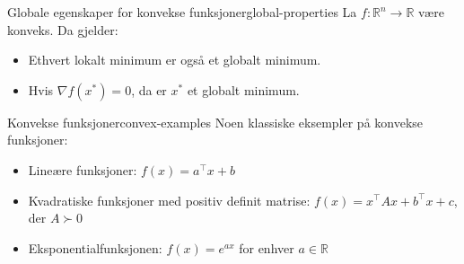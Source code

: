 \begin{theorem}{Globale egenskaper for konvekse funksjoner}{global-properties}
    La $f: \mathbb{R}^n \to \mathbb{R}$ være konveks. Da gjelder:
    \begin{itemize}
        \item Ethvert lokalt minimum er også et globalt minimum.
        \item Hvis $\nabla f(x^*) = 0$, da er $x^*$ et globalt minimum.
    \end{itemize}
\end{theorem}

\begin{example}{Konvekse funksjoner}{convex-examples}
    Noen klassiske eksempler på konvekse funksjoner:
    \begin{itemize}
        \item Lineære funksjoner: $f(x) = a^\top x + b$
        \item Kvadratiske funksjoner med positiv definit matrise: $f(x) = x^\top Ax + b^\top x + c$, der $A \succ 0$
        \item Eksponentialfunksjonen: $f(x) = e^{ax}$ for enhver $a \in \mathbb{R}$
    \end{itemize}
\end{example}